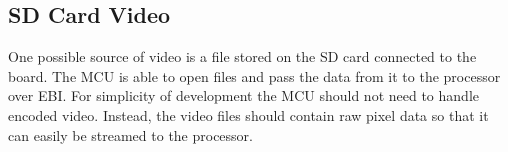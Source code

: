 \subsection{SD Card Video}
One possible source of video is a file stored on the SD card connected to the board.
The MCU is able to open files and pass the data from it to the processor over EBI.
For simplicity of development the MCU should not need to handle encoded video. Instead, the video files should contain raw pixel data so that it can easily be streamed to the processor.
